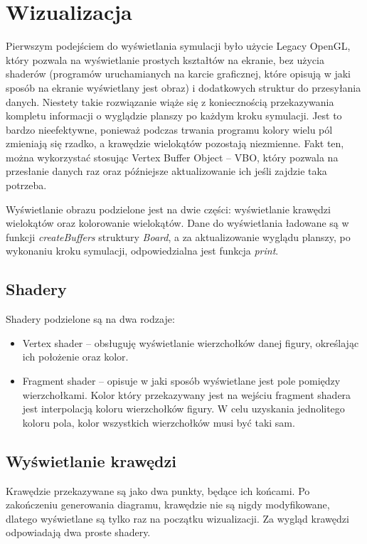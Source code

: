 \documentclass[declaration,shortabstract, inz]{iithesis}
\theoremstyle{definition} \newtheorem{definition}{Definicja}[]
\theoremstyle{plain} \newtheorem{remark}[definition]{Obserwacja}
\theoremstyle{plain} \newtheorem{theorem}[definition]{Twierdzenie}
\theoremstyle{plain} \newtheorem{example}{Przykład}[definition]
\theoremstyle{plain} \newtheorem{lemma}[definition]{Lemat}
\begin{document}
\chapter{Wizualizacja}
\label{sec:openGl}
Pierwszym podejściem do wyświetlania symulacji było użycie Legacy OpenGL, który pozwala na wyświetlanie prostych kształtów na ekranie, bez użycia shaderów (programów uruchamianych na karcie graficznej, które opisują w jaki sposób na ekranie wyświetlany jest obraz) i dodatkowych struktur do przesyłania danych. Niestety takie rozwiązanie wiąże się z koniecznością przekazywania kompletu informacji o wyglądzie planszy po każdym kroku symulacji. Jest to bardzo nieefektywne, ponieważ podczas trwania programu kolory wielu pól zmieniają się rzadko, a krawędzie wielokątów pozostają niezmienne. Fakt ten, można wykorzystać stosując Vertex Buffer Object -- VBO, który pozwala na przesłanie danych raz oraz późniejsze aktualizowanie ich jeśli zajdzie taka potrzeba.

Wyświetlanie obrazu podzielone jest na dwie części: wyświetlanie krawędzi wielokątów oraz kolorowanie wielokątów. Dane do wyświetlania ładowane są w funkcji \textit{createBuffers} struktury \textit{Board}, a za aktualizowanie wyglądu planszy, po wykonaniu kroku symulacji, odpowiedzialna  jest funkcja \textit{print}. 

\section{Shadery}

Shadery podzielone są na dwa rodzaje:
\begin{itemize}

\item Vertex shader -- obsługuję wyświetlanie wierzchołków danej figury, określając ich położenie oraz kolor.
\item Fragment shader -- opisuje w jaki sposób wyświetlane jest pole pomiędzy wierzchołkami. Kolor który przekazywany jest na wejściu fragment shadera jest interpolacją koloru wierzchołków figury. W celu uzyskania jednolitego koloru pola, kolor wszystkich wierzchołków musi być taki sam.

\end{itemize}

\section{Wyświetlanie krawędzi}

Krawędzie przekazywane są jako dwa punkty, będące ich końcami. Po zakończeniu generowania diagramu, krawędzie nie są nigdy modyfikowane, dlatego wyświetlane są tylko raz na początku wizualizacji. Za wygląd krawędzi odpowiadają dwa proste shadery. 
\end{document}
